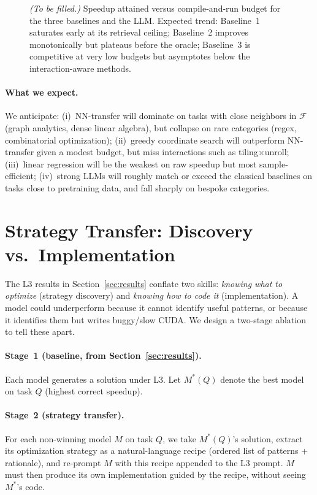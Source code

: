 \documentclass{article}
\begin{document}
\begin{figure}[ht]
\centering
\caption{\emph{(To be filled.)} Speedup attained versus
compile-and-run budget for the three baselines and the LLM.
Expected trend: Baseline~1 saturates early at its retrieval ceiling;
Baseline~2 improves monotonically but plateaus before the oracle;
Baseline~3 is competitive at very low budgets but asymptotes below
the interaction-aware methods.}
\label{fig:strategy-budget}
\end{figure}

\paragraph{What we expect.}
We anticipate: (i)~NN-transfer will dominate on tasks with close
neighbors in $\mathcal{F}$ (graph analytics, dense linear algebra),
but collapse on rare categories (regex, combinatorial optimization);
(ii)~greedy coordinate search will outperform NN-transfer given
a modest budget, but miss interactions such as tiling$\times$unroll;
(iii)~linear regression will be the weakest on raw speedup but most
sample-efficient; (iv)~strong LLMs will roughly match or exceed the
classical baselines on tasks close to pretraining data, and fall
sharply on bespoke categories.

\section{Strategy Transfer: Discovery vs.\ Implementation}
\label{sec:transfer}

The L3 results in Section~\ref{sec:results} conflate two skills:
\emph{knowing what to optimize} (strategy discovery) and
\emph{knowing how to code it} (implementation). A model could
underperform because it cannot identify useful patterns, or because
it identifies them but writes buggy/slow CUDA. We design a two-stage
ablation to tell these apart.

\paragraph{Stage~1 (baseline, from Section~\ref{sec:results}).}
Each model generates a solution under L3. Let $M^{*}(Q)$ denote the
best model on task $Q$ (highest correct speedup).

\paragraph{Stage~2 (strategy transfer).}
For each non-winning model $M$ on task $Q$, we take $M^{*}(Q)$'s
solution, extract its optimization strategy as a natural-language
recipe (ordered list of patterns + rationale), and re-prompt $M$ with
this recipe appended to the L3 prompt. $M$ must then produce its own
implementation guided by the recipe, without seeing $M^{*}$'s code.
\end{document}
